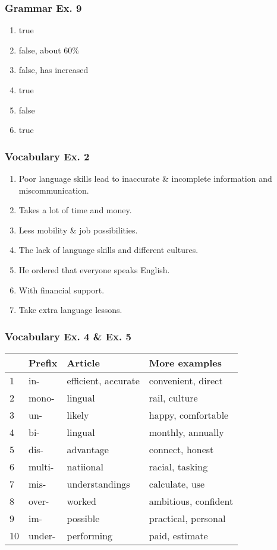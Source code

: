 \documentclass[12pt, a4paper, oneside]{article}
\begin{document}
  \subsubsection{Grammar Ex. 9}
  \begin{enumerate}[1.]
    \item true 
    \item false, about 60\%
    \item false, has increased
    \item true
    \item false
    \item true
  \end{enumerate}


  \subsubsection{Vocabulary Ex. 2}
  \begin{enumerate}[1.]
    \item Poor language skills lead to inaccurate \& incomplete information and miscommunication.
    \item Takes a lot of time and money.
    \item Less mobility \& job possibilities.
    \item The lack of language skills and different cultures.
    \item He ordered that everyone speaks English.
    \item With financial support.
    \item Take extra language lessons.
  \end{enumerate} 

  \subsubsection{Vocabulary Ex. 4 \& Ex. 5}
  \begin{center}
    \begin{tabular}{|l|l|l|l|}
      \hline
      & Prefix & Article & More examples \\ \hline
      1 & in- & efficient, accurate & convenient, direct  \\ \hline
      2 & mono- & lingual & rail, culture \\ \hline
      3 & un- & likely & happy, comfortable \\ \hline
      4 & bi- & lingual & monthly, annually \\ \hline
      5 & dis- & advantage & connect, honest \\ \hline
      6 & multi- & natiional & racial, tasking \\ \hline
      7 & mis- & understandings & calculate, use \\ \hline
      8 & over- & worked & ambitious, confident \\ \hline
      9 & im- & possible & practical, personal \\ \hline
      10 & under- & performing & paid, estimate \\ \hline
    \end{tabular}
  \end{center}
\end{document}
